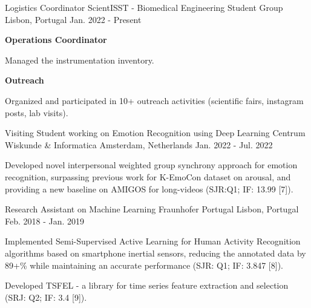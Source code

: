 \begin{cventries}
{\begin{cvitems}
      \end{cvitems}
    }
\cventry
{Logistics Coordinator} %
{ScientISST - Biomedical Engineering Student Group} %
{Lisbon, Portugal} %
{Jan. 2022 - Present} %
{
  \begin{cvitems} %
    \item[] {\textbf{Operations Coordinator}}
    \item {Managed the instrumentation inventory.}
    \item[] {\textbf{Outreach}}
    \item {Organized and participated in 10+ outreach activities (scientific fairs, instagram posts, lab visits).}
  \end{cvitems}
}
\cventry
{Visiting Student working on Emotion Recognition using Deep Learning} %
{Centrum Wiskunde \& Informatica} %
{Amsterdam, Netherlands} %
{Jan. 2022 - Jul. 2022} %
{
  \begin{cvitems} %
    \item {Developed novel interpersonal weighted group synchrony approach for emotion recognition, surpassing previous work for K-EmoCon dataset on arousal, and providing a new baseline on AMIGOS for long-videos (SJR:Q1; IF: 13.99 [7]).}
  \end{cvitems}
}
\cventry
{Research Assistant on Machine Learning} %
{Fraunhofer Portugal} %
{Lisbon, Portugal} %
{Feb. 2018 - Jan. 2019} %
{
  \begin{cvitems} %
    \item {Implemented Semi-Supervised Active Learning for Human Activity Recognition algorithms based on smartphone inertial sensors, reducing the annotated data by 89+\% while maintaining an accurate performance (SJR: Q1; IF: 3.847 [8]).}
    \item {Developed TSFEL - a library for time series feature extraction and selection (SRJ: Q2; IF: 3.4 [9]).}
  \end{cvitems}
}

\end{cventries}
